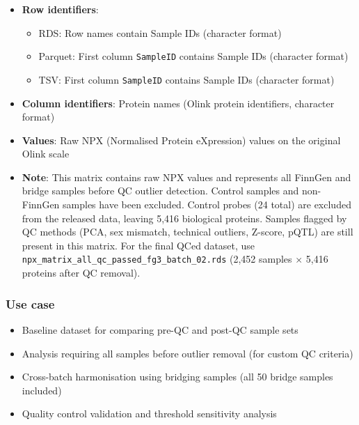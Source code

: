 \documentclass[11pt,a4paper]{article}
\begin{document}
\begin{itemize}
\begin{itemize}
\begin{itemize}
\begin{itemize}
            \item 8 Extension controls (Extension control 1-8)
            \item 8 Amplification controls (Amplification control 1-8)
          \end{itemize}
        \item \textbf{Note}: Control probes are technical quality control measures used by the Olink platform and are excluded from the released data. The original data contained 5,440 proteins (5,416 biological + 24 control probes).
      \end{itemize}
  \end{itemize}
\item \textbf{Row identifiers}:
  \begin{itemize}
    \item RDS: Row names contain Sample IDs (character format)
    \item Parquet: First column \texttt{SampleID} contains Sample IDs (character format)
    \item TSV: First column \texttt{SampleID} contains Sample IDs (character format)
  \end{itemize}
\item \textbf{Column identifiers}: Protein names (Olink protein identifiers, character format)
\item \textbf{Values}: Raw NPX (Normalised Protein eXpression) values on the original Olink scale
\item \textbf{Note}: This matrix contains raw NPX values and represents all FinnGen and bridge samples before QC outlier detection. Control samples and non-FinnGen samples have been excluded. Control probes (24 total) are excluded from the released data, leaving 5,416 biological proteins. Samples flagged by QC methods (PCA, sex mismatch, technical outliers, Z-score, pQTL) are still present in this matrix. For the final QCed dataset, use \texttt{npx\_matrix\_all\_qc\_passed\_fg3\_batch\_02.rds} (2,452 samples $\times$ 5,416 proteins after QC removal).
\end{itemize}

\subsubsection{Use case}
\begin{itemize}
\item Baseline dataset for comparing pre-QC and post-QC sample sets
\item Analysis requiring all samples before outlier removal (for custom QC criteria)
\item Cross-batch harmonisation using bridging samples (all 50 bridge samples included)
\item Quality control validation and threshold sensitivity analysis
\end{itemize}
\end{document}
